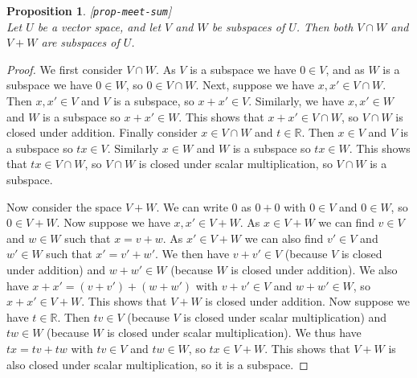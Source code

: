 \documentclass{amsart}
\newcommand{\lbl}[1]{\label{#1}\textup{[\texttt{#1}]}\ \\}
\newcommand{\lbl}{\label}
\newcommand{\R}         {{\mathbb{R}}}
\renewcommand{\:}       {\colon}
\newtheorem{proposition}[theorem]{Proposition}
\theoremstyle{definition}
\begin{document}
\begin{proposition}\lbl{prop-meet-sum}
 Let $U$ be a vector space, and let $V$ and $W$ be subspaces
 of $U$.  Then both $V\cap W$ and $V+W$ are subspaces of
 $U$.
\end{proposition}
\begin{proof}
 We first consider $V\cap W$.  As $V$ is a subspace we have
 $0\in V$, and as $W$ is a subspace we have $0\in W$, so
 $0\in V\cap W$.  Next, suppose we have $x,x'\in V\cap W$.
 Then $x,x'\in V$ and $V$ is a subspace, so $x+x'\in V$.
 Similarly, we have $x,x'\in W$ and $W$ is a subspace so
 $x+x'\in W$.  This shows that $x+x'\in V\cap W$, so $V\cap W$
 is closed under addition.  Finally consider $x\in V\cap W$
 and $t\in\R$.  Then $x\in V$ and $V$ is a subspace so
 $tx\in V$.  Similarly $x\in W$ and $W$ is a subspace so
 $tx\in W$.  This shows that $tx\in V\cap W$, so $V\cap W$
 is closed under scalar multiplication, so $V\cap W$ is a
 subspace. 

 Now consider the space $V+W$.  We can write $0$ as $0+0$
 with $0\in V$ and $0\in W$, so $0\in V+W$.  Now suppose we
 have $x,x'\in V+W$.  As $x\in V+W$ we can find $v\in V$ and
 $w\in W$ such that $x=v+w$.  As $x'\in V+W$ we can also
 find $v'\in V$ and $w'\in W$ such that $x'=v'+w'$.  We then
 have $v+v'\in V$ (because $V$ is closed under addition) and
 $w+w'\in W$ (because $W$ is closed under addition).  We
 also have $x+x'=(v+v')+(w+w')$ with $v+v'\in V$ and
 $w+w'\in W$, so $x+x'\in V+W$.  This shows that $V+W$ is
 closed under addition.  Now suppose we have $t\in\R$.  Then
 $tv\in V$ (because $V$ is closed under scalar
 multiplication) and $tw\in W$  (because $W$ is closed under
 scalar multiplication).  We thus have $tx=tv+tw$ with
 $tv\in V$ and $tw\in W$, so $tx\in V+W$.  This shows that
 $V+W$ is also closed under scalar multiplication, so it is
 a subspace.
\end{proof}
\end{document}
